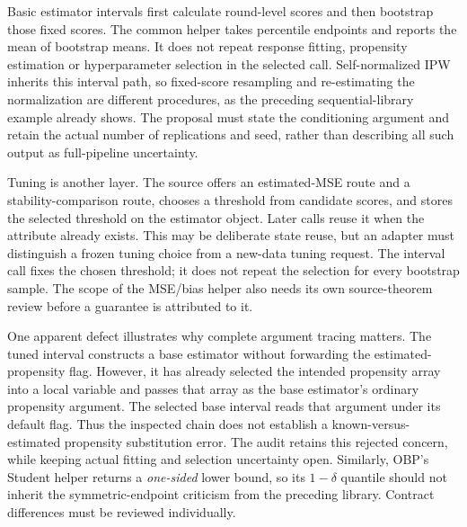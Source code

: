 Basic estimator intervals first calculate round-level scores and then bootstrap
those fixed scores. The common helper takes percentile endpoints and reports
the mean of bootstrap means. It does not repeat response fitting, propensity
estimation or hyperparameter selection in the selected call. Self-normalized
IPW inherits this interval path, so fixed-score resampling and re-estimating the
normalization are different procedures, as the preceding sequential-library
example already shows. The proposal must state the conditioning argument and
retain the actual number of replications and seed, rather than describing all
such output as full-pipeline uncertainty.
\citep{exec23_obp_sources}

Tuning is another layer. The source offers an estimated-MSE route and a
stability-comparison route, chooses a threshold from candidate scores, and
stores the selected threshold on the estimator object. Later calls reuse it
when the attribute already exists. This may be deliberate state reuse, but an
adapter must distinguish a frozen tuning choice from a new-data tuning request.
The interval call fixes the chosen threshold; it does not repeat the selection
for every bootstrap sample. The scope of the MSE/bias helper also needs its own
source-theorem review before a guarantee is attributed to it.
\citep{exec23_obp_sources}

One apparent defect illustrates why complete argument tracing matters. The
tuned interval constructs a base estimator without forwarding the estimated-
propensity flag. However, it has already selected the intended propensity
array into a local variable and passes that array as the base estimator's
ordinary propensity argument. The selected base interval reads that argument
under its default flag. Thus the inspected chain does not establish a
known-versus-estimated propensity substitution error. The audit retains this
rejected concern, while keeping actual fitting and selection uncertainty open.
Similarly, OBP's Student helper returns a \emph{one-sided} lower bound, so its
$1-\delta$ quantile should not inherit the symmetric-endpoint criticism from
the preceding library. Contract differences must be reviewed individually.
\citep{exec23_obp_sources,exec23_obp_reference}

